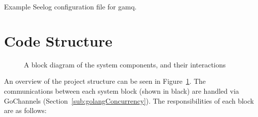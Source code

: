 \begin{listing}[ht]
  \centering
  \inputminted{xml}{code/gamq/config/logconfig.xml}
  \caption{Example Seelog configuration file for gamq.}
  \label{lst:seelogConfig}
\end{listing}

\section{Code Structure}
\label{sec:codestructure}

\begin{figure}[H]
  \centering
  
  \caption{A block diagram of the system components, and their interactions}
  \label{fig:systemBlockDiagram}
\end{figure}

An overview of the project structure can be seen in
Figure~\ref{fig:systemBlockDiagram}. The communications between each system
block (shown in black) are handled via GoChannels
(Section~\ref{sub:golangConcurrency}). The responsibilities of each block are as
follows:

